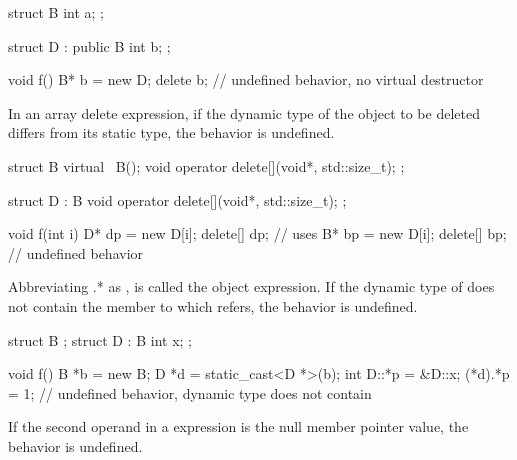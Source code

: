 \pnum
\begin{example}
\begin{codeblock}
struct B {
  int a;
};

struct D : public B {
  int b;
};

void f() {
  B* b = new D;
  delete b;             // undefined behavior, no virtual destructor
}
\end{codeblock}
\end{example}


\pnum
In an array delete expression,
if the dynamic type of the object to be deleted differs
from its static type, the behavior is undefined.

\pnum
\begin{example}
\begin{codeblock}
struct B {
  virtual ~B();
  void operator delete[](void*, std::size_t);
};

struct D : B {
  void operator delete[](void*, std::size_t);
};

void f(int i) {
  D* dp = new D[i];
  delete[] dp;          // uses 
  B* bp = new D[i];
  delete[] bp;          // undefined behavior
}
\end{codeblock}
\end{example}


\pnum
Abbreviating .*
as ,  is called the object expression.
If the dynamic type of  does not contain the member
to which  refers, the behavior is undefined.

\pnum
\begin{example}
\begin{codeblock}
struct B {};
struct D : B {
  int x;
};

void f() {
  B *b = new B;
  D *d = static_cast<D *>(b);
  int D::*p = &D::x;
  (*d).*p = 1;          // undefined behavior, dynamic type  does not contain 
}
\end{codeblock}
\end{example}


\pnum
If the second operand in a  expression is the null
member pointer value, the behavior is undefined.

